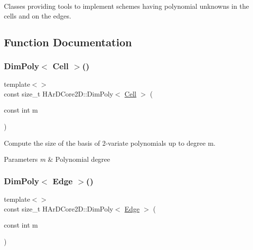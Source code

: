 Classes providing tools to implement schemes having polynomial unknowns in the cells and on the edges.

\subsection{Function Documentation}
\mbox{\label{group__HybridCore_ga320f4be89026a2059fe48d1286a9aebf}} 
\subsubsection{\texorpdfstring{Dim\+Poly$<$ Cell $>$()}{DimPoly< Cell >()}}
{\footnotesize\ttfamily template$<$$>$ \\
const size\+\_\+t H\+Ar\+D\+Core2\+D\+::\+Dim\+Poly$<$ \hyperlink{classHArDCore2D_1_1Cell}{Cell} $>$ (\begin{DoxyParamCaption}\item[{const int}]{m }\end{DoxyParamCaption})\hspace{0.3cm}{\ttfamily [inline]}}



Compute the size of the basis of 2-\/variate polynomials up to degree m. 


\begin{DoxyParams}{Parameters}
{\em m} & Polynomial degree \\
\hline
\end{DoxyParams}
\mbox{\label{group__HybridCore_gaf6de69a77fb6e18b5a92cb09766d50dc}} 
\subsubsection{\texorpdfstring{Dim\+Poly$<$ Edge $>$()}{DimPoly< Edge >()}}
{\footnotesize\ttfamily template$<$$>$ \\
const size\+\_\+t H\+Ar\+D\+Core2\+D\+::\+Dim\+Poly$<$ \hyperlink{classHArDCore2D_1_1Edge}{Edge} $>$ (\begin{DoxyParamCaption}\item[{const int}]{m }\end{DoxyParamCaption})\hspace{0.3cm}{\ttfamily [inline]}}




